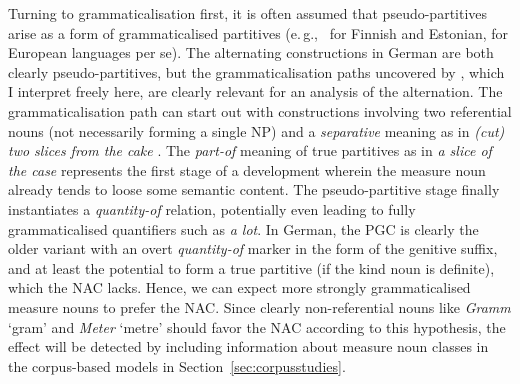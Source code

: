 \documentclass[USenglish]{article}
\newcommand{\eg}{e.\,g.,}
\begin{document}
Turning to grammaticalisation first, it is often assumed that pseudo-partitives arise as a form of grammaticalised partitives (\eg\ \citealp[536--539]{Koptjevskaja2001} for Finnish and Estonian, \citealp[559]{Koptjevskaja2001} for European languages per se).
%
%
%
%
The alternating constructions in German are both clearly pseudo-partitives, but the grammaticalisation paths uncovered by \cite[esp.\ 526--530]{Koptjevskaja2001}, which I interpret freely here, are clearly relevant for an analysis of the alternation.
The grammaticalisation path can start out with constructions involving two referential nouns (not necessarily forming a single NP) and a \textit{separative} meaning as in \textit{(cut) two slices from the cake} \citep[535]{Koptjevskaja2001}.
The \textit{part-of} meaning of true partitives as in \textit{a slice of the case} represents the first stage of a development wherein the measure noun already tends to loose some semantic content.
The pseudo-partitive stage finally instantiates a \textit{quantity-of} relation, potentially even leading to fully grammaticalised quantifiers such as \textit{a lot}.
In German, the PGC is clearly the older variant \citep{Zimmer2015} with an overt \textit{quantity-of} marker in the form of the genitive suffix, and at least the potential to form a true partitive (if the kind noun is definite), which the NAC lacks.
Hence, we can expect more strongly grammaticalised measure nouns to prefer the NAC.
Since clearly non-referential nouns like \textit{Gramm} `gram' and \textit{Meter} `metre' should favor the NAC according to this hypothesis, the effect will be detected by including information about measure noun classes in the corpus-based models in Section~\ref{sec:corpusstudies}.
\end{document}
